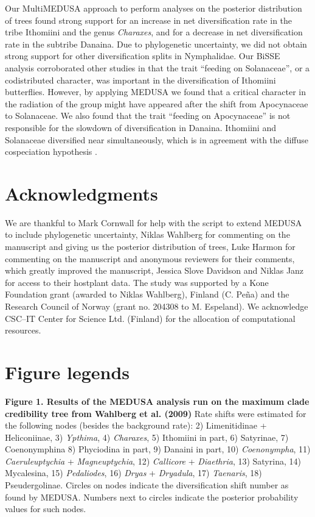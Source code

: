 \documentclass[10pt]{article}
\begin{document}
Our MultiMEDUSA approach to perform analyses on the posterior
distribution of trees found strong support for an increase in net
diversification rate in the tribe Ithomiini and the genus
\emph{Charaxes}, and for a decrease in net diversification rate in the
subtribe Danaina. Due to phylogenetic uncertainty, we did not obtain
strong support for other diversification splits in Nymphalidae. Our
BiSSE analysis corroborated other studies in that the trait ``feeding on
Solanaceae'', or a codistributed character, was important in the
diversification of Ithomiini butterflies. However, by applying MEDUSA we
found that a critical character in the radiation of the group might have
appeared after the shift from Apocynaceae to Solanaceae. We also found
that the trait ``feeding on Apocynaceae'' is not responsible for the
slowdown of diversification in Danaina. Ithomiini and Solanaceae
diversified near simultaneously, which is in agreement with the diffuse
cospeciation hypothesis \cite{nyman2012, janz2011}.

\section*{Acknowledgments}
We are thankful to Mark Cornwall for help with the script to extend
MEDUSA to include phylogenetic uncertainty, Niklas Wahlberg for
commenting on the manuscript and giving us the posterior distribution of
trees, Luke Harmon for commenting on the manuscript and anonymous
reviewers for their comments, which greatly improved the manuscript,
Jessica Slove Davidson and Niklas Janz for access to their hostplant
data. The study was supported by a Kone Foundation grant (awarded to
Niklas Wahlberg), Finland (C. Pe\~na) and the Research Council of Norway
(grant no. 204308 to M. Espeland). We acknowledge CSC--IT Center for
Science Ltd. (Finland) for the allocation of computational resources.

\section*{Figure legends}
{\bf Figure 1. Results of the MEDUSA analysis run on the maximum
clade credibility tree from Wahlberg et al. (2009)} Rate shifts were estimated for the
following nodes (besides the background rate): 2) Limenitidinae +
Heliconiinae, 3) \emph{Ypthima}, 4) \emph{Charaxes}, 5) Ithomiini in
part, 6) Satyrinae, 7) Coenonymphina 8) Phyciodina in part, 9) Danaini in
part, 10) \emph{Coenonympha}, 11) \emph{Caeruleuptychia} +
\emph{Magneuptychia}, 12) \emph{Callicore} + \emph{Diaethria}, 13)
Satyrina, 14) Mycalesina, 15) \emph{Pedaliodes}, 16) \emph{Dryas} +
\emph{Dryadula}, 17) \emph{Taenaris}, 18) Pseudergolinae. Circles on
nodes indicate the diversification shift number as found by MEDUSA.
Numbers next to circles indicate the posterior probability values for
such nodes.
\end{document}
